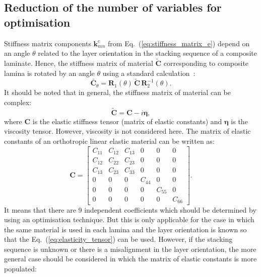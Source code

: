 \documentclass[preprint,12pt]{elsarticle}
\newcommand{\matr}[1]{\mathbf{#1}} %
\newcommand{\bs}[1]{\boldsymbol{#1}}
\begin{document}
 \subsection{Reduction of the number of variables for optimisation}
 Stiffness matrix components \(\matr{k}_{mn}^e\) from 
 Eq.~(\ref{eq:stiffness_matrix_e}) 
 depend on an angle \(\theta\) related to the layer orientation in the stacking sequence 
 of 
 a composite laminate. Hence, the stiffness matrix of material \(\tilde{\matr{C}}\) 
 corresponding to composite lamina is rotated by an angle \(\theta\) using a standard 
 calculation~\cite{Bartoli2006,Taupin2011}:
 \begin{equation}
	\tilde{ \matr{C}_{\theta}}= \matr{R}_1(\theta) \,\tilde{\matr{C}} \,\matr{R}_2^{-1}(\theta).
	 \label{eq:elasticity_tensor}
 \end{equation}
 It should be noted that in general, the stiffness matrix of material can be complex:
 \begin{equation}
 \tilde{\matr{C}}= \matr{C} - i \bs{\eta},
 \label{eq:complex_elasticity_tensor}
 \end{equation}
 where \(\matr{C} \) is the elastic stiffness tensor (matrix of elastic constants) and 
 \(\bs{\eta}\) is the viscosity tensor. However, viscosity is not considered here. The 
 matrix of elastic constants of an orthotropic linear elastic material can be written as:
 \begin{equation}
 \matr{C} = \left[\begin{array}{cccccc} C_{11} & C_{12}& C_{13} & 0&0&0\\[2pt]
 C_{12}& C_{22} & C_{23}& 0&0&0\\[2pt]
 C_{13}&C_{23}&C_{33}&0&0&0\\[2pt]
 0& 0 &0&C_{44}& 0&0\\[2pt]
 0&0&0&0&C_{55}&0\\[2pt]
  0&0&0&0&0&C_{66}
  \end{array}\right]. 
  \label{eq:elastic_constatns}
 \end{equation} 
 It means that there are 9 independent coefficients which should be determined by using an optimisation technique. But this is only applicable for the case in which the same material is used in each lamina and the layer orientation is known so that the Eq.~(\ref{eq:elasticity_tensor}) can be used. However, if the stacking sequence is unknown or there is a misalignment in the layer orientation, the more general case should be considered in which the matrix of elastic constants is more populated:
\end{document}
